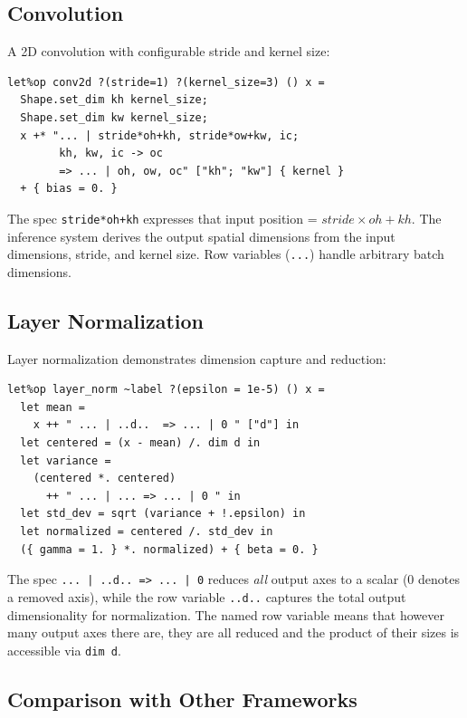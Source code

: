 \documentclass[acmsmall,nonacm,review]{acmart}
\newcommand{\code}[1]{\lstinline[basicstyle=\normalsize\ttfamily]{#1}}
\newcommand{\spec}[1]{\texttt{\small #1}}
\begin{document}
\subsection{Convolution}
\label{sec:conv}

A 2D convolution with configurable stride and kernel size:

\begin{lstlisting}
let%op conv2d ?(stride=1) ?(kernel_size=3) () x =
  Shape.set_dim kh kernel_size;
  Shape.set_dim kw kernel_size;
  x +* "... | stride*oh+kh, stride*ow+kw, ic;
        kh, kw, ic -> oc
        => ... | oh, ow, oc" ["kh"; "kw"] { kernel }
  + { bias = 0. }
\end{lstlisting}

The spec \spec{stride*oh+kh} expresses that input position =
$\mathit{stride} \times \mathit{oh} + \mathit{kh}$. The inference system
derives the output spatial dimensions from the input dimensions, stride, and
kernel size. Row variables (\spec{...}) handle arbitrary batch dimensions.

\subsection{Layer Normalization}
\label{sec:layernorm}

Layer normalization demonstrates dimension capture and reduction:

\begin{lstlisting}
let%op layer_norm ~label ?(epsilon = 1e-5) () x =
  let mean =
    x ++ " ... | ..d..  => ... | 0 " ["d"] in
  let centered = (x - mean) /. dim d in
  let variance =
    (centered *. centered)
      ++ " ... | ... => ... | 0 " in
  let std_dev = sqrt (variance + !.epsilon) in
  let normalized = centered /. std_dev in
  ({ gamma = 1. } *. normalized) + { beta = 0. }
\end{lstlisting}

The spec \spec{... | ..d.. => ... | 0} reduces \emph{all} output axes to a
scalar (0 denotes a removed axis), while the row variable \spec{..d..}
captures the total output dimensionality for normalization. The named row
variable means that however many output axes there are, they are all reduced
and the product of their sizes is accessible via \code{dim d}.

\subsection{Comparison with Other Frameworks}
\label{sec:comparison}
\end{document}
